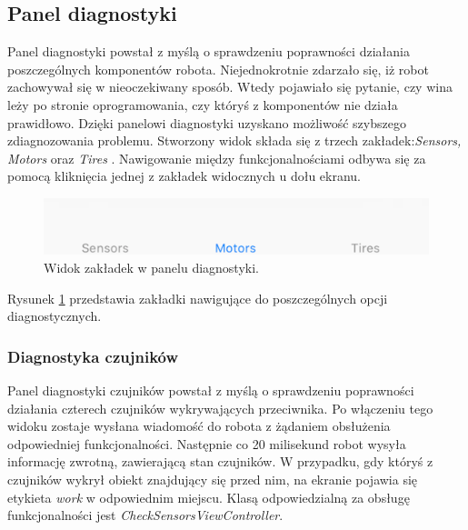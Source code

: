 \subsection{Panel diagnostyki}
Panel diagnostyki powstał z myślą o sprawdzeniu poprawności działania poszczególnych komponentów robota. Niejednokrotnie zdarzało się, iż robot zachowywał się w nieoczekiwany sposób. Wtedy pojawiało się pytanie, czy wina leży po stronie oprogramowania, czy któryś z komponentów nie działa prawidłowo. Dzięki panelowi diagnostyki uzyskano możliwość szybszego zdiagnozowania problemu. 
Stworzony widok składa się z trzech zakładek:\textit{Sensors, Motors} oraz \textit{Tires} . Nawigowanie między funkcjonalnościami odbywa się za pomocą kliknięcia jednej z zakładek widocznych u dołu ekranu. 

\begin{figure}[H]
	\centering
		\includegraphics[width=0.75\linewidth, fbox]{pic05/tabs}
	\caption{Widok zakładek w panelu diagnostyki.}
	\label{fig:pitstopview}	
\end{figure}

Rysunek \ref{fig:pitstopview} przedstawia zakładki nawigujące do poszczególnych opcji diagnostycznych.

\newpage

\subsubsection{Diagnostyka czujników}
Panel diagnostyki czujników powstał z myślą o sprawdzeniu poprawności działania czterech czujników wykrywających przeciwnika. Po włączeniu tego widoku zostaje wysłana wiadomość do robota z żądaniem obsłużenia odpowiedniej funkcjonalności. Następnie co 20 milisekund robot wysyła informację zwrotną, zawierającą stan czujników. W przypadku, gdy któryś z czujników wykrył obiekt znajdujący się przed nim, na ekranie pojawia się etykieta \textit{work} w odpowiednim miejscu. Klasą odpowiedzialną za obsługę funkcjonalności jest \textit{CheckSensorsViewController}.

